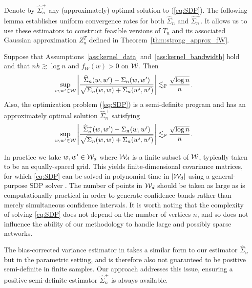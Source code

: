 Denote by $\widehat\Sigma_n^+$ any (approximately) optimal solution to
(\ref{eq:SDP}). The following lemma establishes uniform convergence rates
for both $\widehat \Sigma_n$ and $\widehat \Sigma_n^+$. It allows us to use
these estimators to construct feasible versions of $T_n$ and its associated
Gaussian approximation $Z_n^{T}$ defined in Theorem~\ref{thm:strong_approx_fW}.
%
\begin{lemma}
  \label{lem:SDP}
  Suppose that Assumptions~\ref{ass:kernel_data}
  and~\ref{ass:kernel_bandwidth} hold
  and that
  $n h \gtrsim \log n$ and
  $f_W(w) > 0$ on $\mathcal{W}$.
  Then
  \begin{align*}
    \sup_{w,w' \in \mathcal{W}}
    \left|
    \frac{\widehat \Sigma_n(w,w') - \Sigma_n(w,w')}
    {\sqrt{\Sigma_n(w,w) + \Sigma_n(w',w')}}
    \right|
    &\lesssim_{\mathbb{P}}
    \frac{\sqrt{\log n}}{n}.
  \end{align*}
  Also, the optimization problem (\ref{eq:SDP})
  is a semi-definite program
  \citep[SDP,][]{laurent2005semidefinite}
  and has an approximately
  optimal solution
  $\widehat\Sigma_n^+$
  satisfying
  \begin{align*}
    \sup_{w,w' \in \mathcal{W}}
    \left|
    \frac{\widehat \Sigma_n^+(w,w') - \Sigma_n(w,w')}
    {\sqrt{\Sigma_n(w,w) + \Sigma_n(w',w')}}
    \right|
    &\lesssim_{\mathbb{P}}
    \frac{\sqrt{\log n}}{n}.
  \end{align*}
\end{lemma}

In practice we take $w, w' \in \mathcal{W}_d$ where $\mathcal{W}_d$ is a finite
subset of $\mathcal{W}$, typically taken to be an equally-spaced grid.
This yields finite-dimensional covariance matrices,
for which \eqref{eq:SDP}
can be solved in polynomial time in $|\mathcal{W}_d|$ using
a general-purpose SDP solver
\citep[e.g.\ by interior point methods,][]{laurent2005semidefinite}.
The number of points in $\mathcal{W}_d$ should be taken as large as is
computationally practical in order to generate
confidence bands rather than merely simultaneous confidence intervals.
It is worth noting that the complexity of solving \eqref{eq:SDP}
does not depend on the number of vertices $n$,
and so does not influence the ability
of our methodology to handle large and possibly sparse networks.

The bias-corrected variance estimator in
\citet[Section~3.2]{MatsushitaOtsu2021} takes a similar form
to our estimator $\widehat\Sigma_n$ but in the parametric setting,
and is therefore also not guaranteed
to be positive semi-definite in finite samples.
Our approach addresses this issue,
ensuring a positive semi-definite estimator
$\widehat\Sigma_n^+$ is always available.

